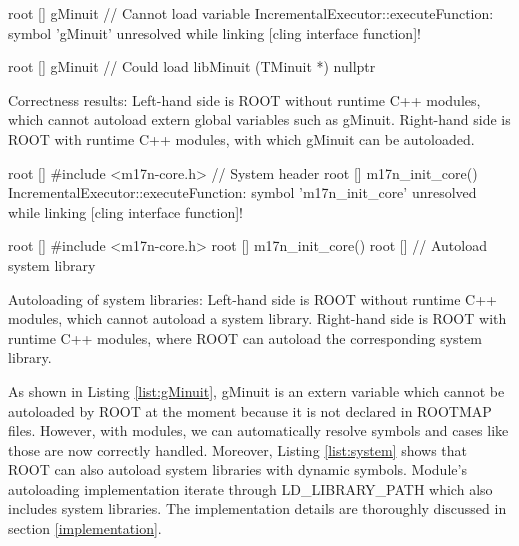 \documentclass{webofc}
\begin{document}
\begin{listing}[h]
    \noindent
    \begin{minipage}[h]{.48\textwidth}
    \begin{cppcode*}{}
root [] gMinuit // Cannot load variable
IncrementalExecutor::executeFunction:
symbol 'gMinuit' unresolved while
linking [cling interface function]!
    \end{cppcode*}
    \end{minipage}\hfill
    \begin{minipage}[h]{.48\textwidth}
    \begin{cppcode*}{}
root [] gMinuit // Could load libMinuit
(TMinuit *) nullptr
    \end{cppcode*}
    \end{minipage}
    \caption{Correctness results: Left-hand side is ROOT without runtime C++ modules, which cannot autoload extern global variables such as gMinuit. Right-hand side is ROOT with runtime C++ modules, with which gMinuit can be autoloaded.}
    \label{list:gMinuit}
\end{listing}

\begin{listing}[h]
    \noindent
    \begin{minipage}[h]{.48\textwidth}
    \begin{cppcode*}{}
root [] #include <m17n-core.h> // System header
root [] m17n_init_core()
IncrementalExecutor::executeFunction:
symbol 'm17n_init_core' unresolved while
linking [cling interface function]!
    \end{cppcode*}
    \end{minipage}\hfill
    \begin{minipage}[h]{.48\textwidth}
    \begin{cppcode*}{}
root [] #include <m17n-core.h>
root [] m17n_init_core()
root [] // Autoload system library
    \end{cppcode*}
    \end{minipage}
    \caption{Autoloading of system libraries: Left-hand side is ROOT without runtime C++ modules, which cannot autoload a system library. Right-hand side is ROOT with runtime C++ modules, where ROOT can autoload the corresponding system library.}
    \label{list:system}
\end{listing}

As shown in Listing \ref{list:gMinuit}, gMinuit is an extern variable which cannot be autoloaded by ROOT at the moment because it is not declared in ROOTMAP files. However, with modules, we can automatically resolve symbols and cases like those are now correctly handled. Moreover, Listing \ref{list:system} shows that ROOT can also autoload system libraries with dynamic symbols. Module's autoloading implementation iterate through LD\_LIBRARY\_PATH which also includes system libraries. The implementation details are thoroughly discussed in section \ref{implementation}.
\end{document}

